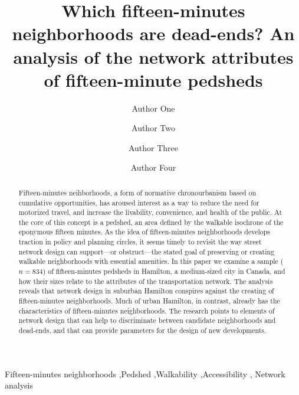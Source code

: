 \documentclass[preprint, 3p,
authoryear]{elsarticle} %
\begin{document}
\begin{frontmatter}

  \title{Which fifteen-minutes neighborhoods are dead-ends? An analysis
of the network attributes of fifteen-minute pedsheds}
    \author[University One]{Author One%
  }
    \author[University Two]{Author Two%
  }
    \author[University One]{Author Three%
  }
    \author[University One]{Author Four%
  }
  
  \begin{abstract}
  Fifteen-minutes neihborhoods, a form of normative chronourbanism based
  on cumulative opportunities, has aroused interest as a way to reduce
  the need for motorized travel, and increase the livability,
  convenience, and health of the public. At the core of this concept is
  a pedshed, an area defined by the walkable isochrone of the eponymous
  fifteen minutes. As the idea of fifteen-minutes neighborhoods develops
  traction in policy and planning circles, it seems timely to revisit
  the way street network design can support---or obstruct---the stated
  goal of preserving or creating walkable neighborhoods with essential
  amenities. In this paper we examine a sample (\(n=834\)) of
  fifteen-minutes pedsheds in Hamilton, a medium-sized city in Canada,
  and how their sizes relate to the attributes of the transportation
  network. The analysis reveals that network design in suburban Hamilton
  conspires against the creating of fifteen-minutes neighborhoods. Much
  of urban Hamilton, in contrast, already has the characteristics of
  fifteen-minutes neighborhoods. The research points to elements of
  network design that can help to discriminate between candidate
  neighborhoods and dead-ends, and that can provide parameters for the
  design of new developments.
  \end{abstract}
    \begin{keyword}
    Fifteen-minutes
neighborhoods \sep Pedshed \sep Walkability \sep Accessibility \sep 
    Network analysis
  \end{keyword}
  
 \end{frontmatter}
\end{document}
